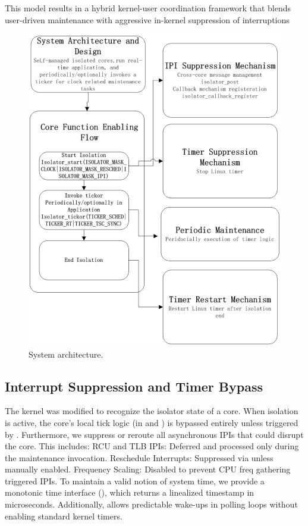 \documentclass[letterpaper]{article}
\begin{document}
This model results in a hybrid kernel-user coordination framework that blends user-driven
maintenance with aggressive in-kernel suppression of interruptions

\begin{figure}
    \centering
    \includegraphics[width=0.85\columnwidth]{architecture.png}
    \caption{System architecture.}
    \label{fig:architecture}
\end{figure}

\subsection{Interrupt Suppression and Timer Bypass} 
The kernel was modified to recognize the isolator state of a core. When isolation is active, the
core's local tick logic (in and ) is bypassed entirely unless triggered by . Furthermore, we suppress
or reroute all asynchronous IPIs that could disrupt the core. This includes:
RCU and TLB IPIs: Deferred and processed only during the maintenance invocation.
Reschedule Interrupts: Suppressed via unless manually enabled.
Frequency Scaling: Disabled to prevent CPU freq gathering triggered IPIs.
To maintain a valid notion of system time, we provide a monotonic time interface (), which returns
a linealized timestamp in microseconds. Additionally, allows predictable wake-ups in polling loops
without enabling standard kernel timers.
\end{document}
